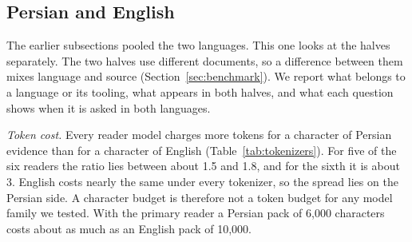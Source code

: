 \subsection{Persian and English}
\label{sec:language}

The earlier subsections pooled the two languages. This one looks at the halves separately. The two halves use different documents, so a difference between them mixes language and source (Section~\ref{sec:benchmark}). We report what belongs to a language or its tooling, what appears in both halves, and what each question shows when it is asked in both languages.

\emph{Token cost.} Every reader model charges more tokens for a character of Persian evidence than for a character of English (Table~\ref{tab:tokenizers}). For five of the six readers the ratio lies between about 1.5 and 1.8, and for the sixth it is about 3. English costs nearly the same under every tokenizer, so the spread lies on the Persian side. A character budget is therefore not a token budget for any model family we tested. With the primary reader a Persian pack of 6,000 characters costs about as much as an English pack of 10,000.


